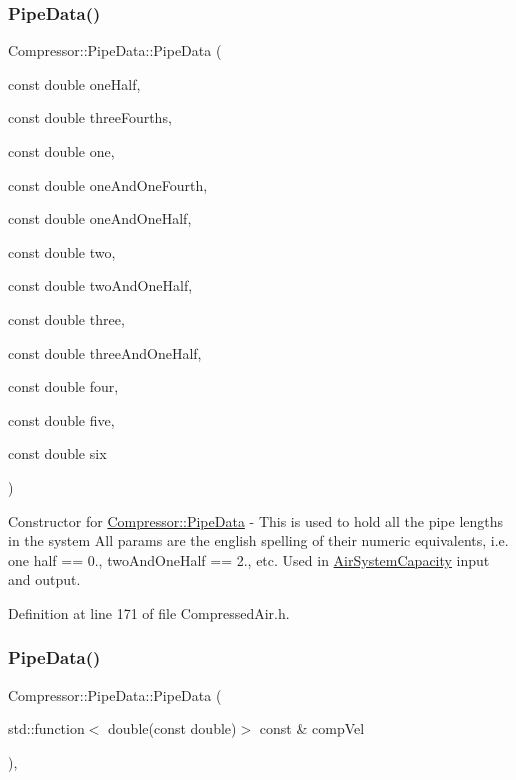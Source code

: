 \subsubsection{\texorpdfstring{Pipe\+Data()}{PipeData()}\hspace{0.1cm}{\footnotesize\ttfamily [3/6]}}
{\footnotesize\ttfamily Compressor\+::\+Pipe\+Data\+::\+Pipe\+Data (\begin{DoxyParamCaption}\item[{const double}]{one\+Half,  }\item[{const double}]{three\+Fourths,  }\item[{const double}]{one,  }\item[{const double}]{one\+And\+One\+Fourth,  }\item[{const double}]{one\+And\+One\+Half,  }\item[{const double}]{two,  }\item[{const double}]{two\+And\+One\+Half,  }\item[{const double}]{three,  }\item[{const double}]{three\+And\+One\+Half,  }\item[{const double}]{four,  }\item[{const double}]{five,  }\item[{const double}]{six }\end{DoxyParamCaption})\hspace{0.3cm}{\ttfamily [inline]}}

Constructor for \hyperlink{struct_compressor_1_1_pipe_data}{Compressor\+::\+Pipe\+Data} -\/ This is used to hold all the pipe lengths in the system All params are the english spelling of their numeric equivalents, i.\+e. one half == 0., two\+And\+One\+Half == 2., etc. Used in \hyperlink{class_compressor_1_1_air_system_capacity}{Air\+System\+Capacity} input and output. 

Definition at line 171 of file Compressed\+Air.\+h.

\mbox{\label{struct_compressor_1_1_pipe_data_af7998fd533340b0a84e78fcda91b4806}} 
\subsubsection{\texorpdfstring{Pipe\+Data()}{PipeData()}\hspace{0.1cm}{\footnotesize\ttfamily [4/6]}}
{\footnotesize\ttfamily Compressor\+::\+Pipe\+Data\+::\+Pipe\+Data (\begin{DoxyParamCaption}\item[{std\+::function$<$ double(const double)$>$ const \&}]{comp\+Vel }\end{DoxyParamCaption})\hspace{0.3cm}{\ttfamily [inline]}, {\ttfamily [explicit]}}

